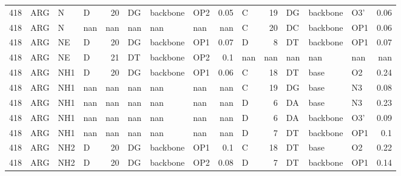 \begin{longtable}{rlllrlllrlrlllr}
       418 & ARG        & N      & D         &          20 & DG           & backbone    & OP2      &          0.05 & C         &          19 & DG           & backbone    & O3'      &          0.06 \\
       418 & ARG        & N      & nan       &         nan & nan          & nan         & nan      &        nan    & C         &          20 & DC           & backbone    & OP1      &          0.06 \\
       418 & ARG        & NE     & D         &          20 & DG           & backbone    & OP1      &          0.07 & D         &           8 & DT           & backbone    & OP1      &          0.07 \\
       418 & ARG        & NE     & D         &          21 & DT           & backbone    & OP2      &          0.1  & nan       &         nan & nan          & nan         & nan      &        nan    \\
       418 & ARG        & NH1    & D         &          20 & DG           & backbone    & OP1      &          0.06 & C         &          18 & DT           & base        & O2       &          0.24 \\
       418 & ARG        & NH1    & nan       &         nan & nan          & nan         & nan      &        nan    & C         &          19 & DG           & base        & N3       &          0.08 \\
       418 & ARG        & NH1    & nan       &         nan & nan          & nan         & nan      &        nan    & D         &           6 & DA           & base        & N3       &          0.23 \\
       418 & ARG        & NH1    & nan       &         nan & nan          & nan         & nan      &        nan    & D         &           6 & DA           & backbone    & O3'      &          0.09 \\
       418 & ARG        & NH1    & nan       &         nan & nan          & nan         & nan      &        nan    & D         &           7 & DT           & backbone    & OP1      &          0.1  \\
       418 & ARG        & NH2    & D         &          20 & DG           & backbone    & OP1      &          0.1  & C         &          18 & DT           & base        & O2       &          0.22 \\
       418 & ARG        & NH2    & D         &          20 & DG           & backbone    & OP2      &          0.08 & D         &           7 & DT           & backbone    & OP1      &          0.14 \\

\end{longtable}
